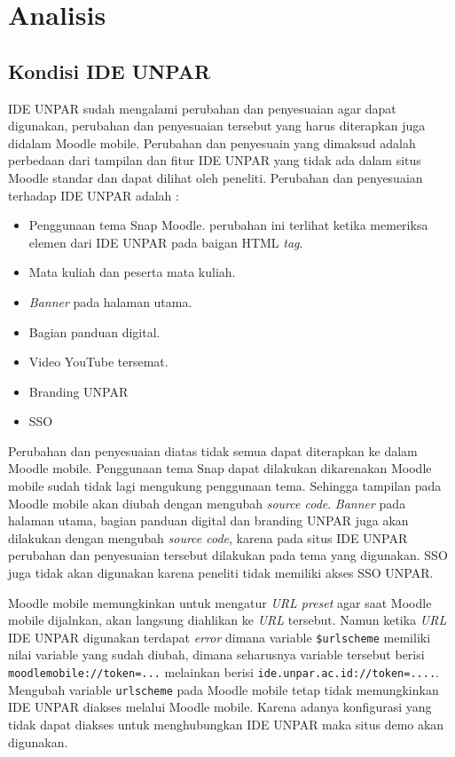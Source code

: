 \chapter{Analisis}
\label{chap:analsa}

\section{Kondisi IDE UNPAR}
\label{sec:Kondisi IDE UNPAR} 
IDE UNPAR sudah mengalami perubahan dan penyesuaian agar dapat digunakan, perubahan dan penyesuaian tersebut yang harus diterapkan juga didalam Moodle mobile. Perubahan dan penyesuain yang dimaksud adalah perbedaan dari tampilan dan fitur IDE UNPAR yang tidak ada dalam situs Moodle standar dan dapat dilihat oleh peneliti. Perubahan dan penyesuaian  terhadap IDE UNPAR adalah : \cite{IDEUNPAR}

\begin{itemize}
\item Penggunaan tema Snap Moodle. perubahan ini terlihat ketika memeriksa elemen dari IDE UNPAR pada baigan HTML \textit{tag}.
\item Mata kuliah dan peserta mata kuliah.
\item \textit{Banner} pada halaman utama.
\item Bagian panduan digital.
\item Video YouTube tersemat.
\item Branding UNPAR
\item SSO
\end{itemize}

Perubahan dan penyesuaian diatas tidak semua dapat diterapkan ke dalam Moodle mobile. Penggunaan tema Snap dapat dilakukan dikarenakan Moodle mobile sudah tidak lagi mengukung penggunaan tema. Sehingga tampilan pada Moodle mobile akan diubah dengan mengubah \textit{source code}. \textit{Banner} pada halaman utama, bagian panduan digital dan branding UNPAR juga akan dilakukan dengan mengubah \textit{source code}, karena pada situs IDE UNPAR perubahan dan penyesuaian tersebut dilakukan pada tema yang digunakan. SSO juga tidak akan digunakan karena peneliti tidak memiliki akses SSO UNPAR.

Moodle mobile memungkinkan untuk mengatur \textit{URL preset} agar saat Moodle mobile dijalnkan, akan langsung diahlikan ke \textit{URL} tersebut. Namun ketika \textit{URL} IDE UNPAR digunakan terdapat \textit{error} dimana variable \texttt{\$urlscheme} memiliki nilai variable yang sudah diubah, dimana seharusnya variable tersebut berisi \texttt{moodlemobile://token=...} melainkan berisi \texttt{ide.unpar.ac.id://token=....}. Mengubah variable \texttt{urlscheme} pada Moodle mobile tetap tidak memungkinkan  IDE UNPAR diakses melalui Moodle mobile. Karena  adanya konfigurasi yang tidak dapat diakses untuk menghubungkan IDE UNPAR maka situs demo akan digunakan.

